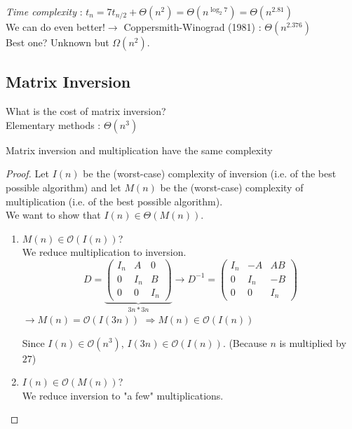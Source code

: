 \emph{Time complexity} : $t_n=7t_{n/2}+\Theta(n^2)=\Theta\left(n^{\log_2 7}\right)=\Theta\left(n^{2.81}\right)$\\
We can do even better!$\rightarrow$ Coppersmith-Winograd (1981) : $\Theta(n^{2.376})$\\
Best one? Unknown but $\Omega(n^2)$.

\subsection{Matrix Inversion}
What is the cost of matrix inversion?\\
Elementary methods : $\Theta(n^3)$
\begin{theorem}
Matrix inversion and multiplication have the same complexity
\end{theorem}
\begin{proof}
Let $I(n)$ be the (worst-case) complexity of inversion (i.e. of the best possible algorithm) and let $M(n)$ be the (worst-case) complexity of multiplication (i.e. of the best possible algorithm).\\
We want to show that $I(n)\in \Theta(M(n))$.
\begin{enumerate}%
\item $M(n)\in \mathcal{O}(I(n))$?\\
We reduce multiplication to inversion.\\

$$D=\underbrace{\begin{pmatrix}
I_n & A & 0\\
0 & I_n & B\\
0 & 0 & I_n
\end{pmatrix}}\limits_{3n*3n}
\rightarrow D^{-1}=\begin{pmatrix}
I_n & -A & AB\\
0 & I_n & -B\\
0 & 0 & I_n
\end{pmatrix} $$
\hspace*{2cm}$\rightarrow M(n)=\mathcal{O}(I(3n))$ \hspace*{4cm} $\Rightarrow M(n) \in \mathcal{O}(I(n))$

Since $I(n) \in \mathcal{O}(n^3)$, $I(3n)\in \mathcal{O}(I(n))$. (Because $n$ is multiplied by $27$)\\

\item $I(n)\in \mathcal{O}(M(n))$?\\

We reduce inversion to "a few" multiplications.


\end{enumerate}
\end{proof}

